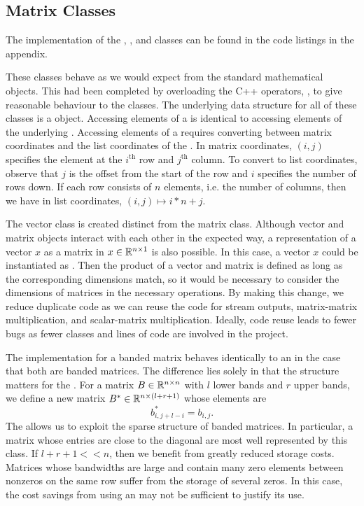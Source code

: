 \subsection{Matrix Classes}

The implementation of the , , and  classes can be found in the code listings in the appendix.

These classes behave as we would expect from the standard mathematical objects. 
This had been completed by overloading the C++ operators, \inline{+, -, *, /}, to give reasonable behaviour to the classes.
The underlying data structure for all of these classes is a  object.
Accessing elements of a  is identical to accessing elements of the underlying .
Accessing elements of a  requires converting between matrix coordinates and the list coordinates of the .
In matrix coordinates, $(i,j)$ specifies the element at the $i^\mathrm{th}$ row and $j^\mathrm{th}$ column.
To convert to list coordinates, observe that $j$ is the offset from the start of the row and $i$ specifies the number of rows down.
If each row consists of $n$ elements, i.e. the number of columns, then we have in list coordinates, $(i,j) \mapsto i*n + j$.


The vector class is created distinct from the matrix class.
Although vector and matrix objects interact with each other in the expected way, a representation of a vector $x$ as a matrix in $x\in\mathbb{R}^{n\times 1}$ is also possible.
In this case, a vector $x$ could be instantiated as .
Then the product of a vector and matrix is defined as long as the corresponding dimensions match, so it would be necessary to consider the dimensions of matrices in the necessary operations.
By making this change, we reduce duplicate code as we can reuse the code for stream outputs, matrix-matrix multiplication, and scalar-matrix multiplication.
Ideally, code reuse leads to fewer bugs as fewer classes and lines of code are involved in the project.


The  implementation for a banded matrix behaves identically to an  in the case that both are banded matrices.
The difference lies solely in that the structure matters for the .
For a matrix $B\in\mathbb{R}^{n\times n}$ with $l$ lower bands and $r$ upper bands, we define a new matrix $B^*\in\mathbb{R}^{n \times (l+r+1)}$ whose elements are
\[
    b^*_{i,j+l-i} = b_{i,j}.
\]
The  allows us to exploit the sparse structure of banded matrices.
In particular, a matrix whose entries are close to the diagonal are most well represented by this class. 
If $l+r+1 << n$, then we benefit from greatly reduced storage costs.
Matrices whose bandwidths are large and contain many zero elements between nonzeros on the same row suffer from the storage of several zeros.
In this case, the cost savings from using an  may not be sufficient to justify its use.

